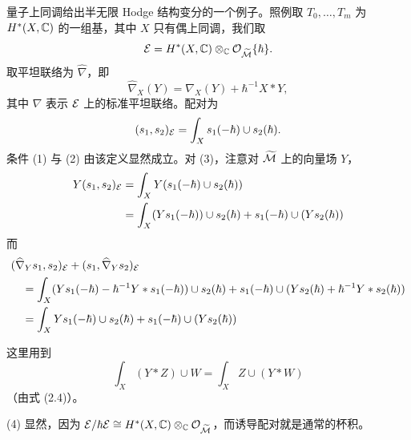 \begin{example}
量子上同调给出半无限 Hodge 结构变分的一个例子。照例取 $T_0,\dots,T_m$ 为 $H^*(X,\mathbb{C})$ 的一组基，其中 $X$ 只有偶上同调，我们取
\[
\mathcal{E}=H^*(X,\mathbb{C})\otimes_{\mathbb{C}}\mathcal{O}_{\widetilde{\mathcal{M}}}\{\hbar\}.
\]
取平坦联络为 $\widehat{\nabla}$，即
\[
\widehat{\nabla}_X(Y)=\nabla_X(Y)+\hbar^{-1}X*Y,
\]
其中 $\nabla$ 表示 $\mathcal{E}$ 上的标准平坦联络。配对为
\[
(s_1,s_2)_{\mathcal{E}}=\int_X s_1(-\hbar)\cup s_2(\hbar).
\]
条件 (1) 与 (2) 由该定义显然成立。对 (3)，注意对 $\widetilde{\mathcal{M}}$ 上的向量场 $Y$，
\begin{align*}
Y(s_1,s_2)_{\mathcal{E}} &= \int_X Y(s_1(-\hbar)\cup s_2(\hbar))\\
&= \int_X (Ys_1(-\hbar))\cup s_2(\hbar)+s_1(-\hbar)\cup(Ys_2(\hbar))
\end{align*}
而
\begin{align*}
&(\widehat{\nabla}_Y s_1,s_2)_{\mathcal{E}}+(s_1,\widehat{\nabla}_Y s_2)_{\mathcal{E}}\\
&\quad=\int_X (Ys_1(-\hbar)-\hbar^{-1}Y*s_1(-\hbar))\cup s_2(\hbar)+s_1(-\hbar)\cup(Ys_2(\hbar)+\hbar^{-1}Y*s_2(\hbar))\\
&\quad=\int_X Ys_1(-\hbar)\cup s_2(\hbar)+s_1(-\hbar)\cup(Ys_2(\hbar))
\end{align*}

这里用到
\[
\int_X(Y*Z)\cup W=\int_X Z\cup(Y*W)
\]
（由式 (2.4)）。

(4) 显然，因为 $\mathcal{E}/\hbar\mathcal{E}\cong H^*(X,\mathbb{C})\otimes_{\mathbb{C}}\mathcal{O}_{\widetilde{\mathcal{M}}}$，而诱导配对就是通常的杯积。


\end{example}
